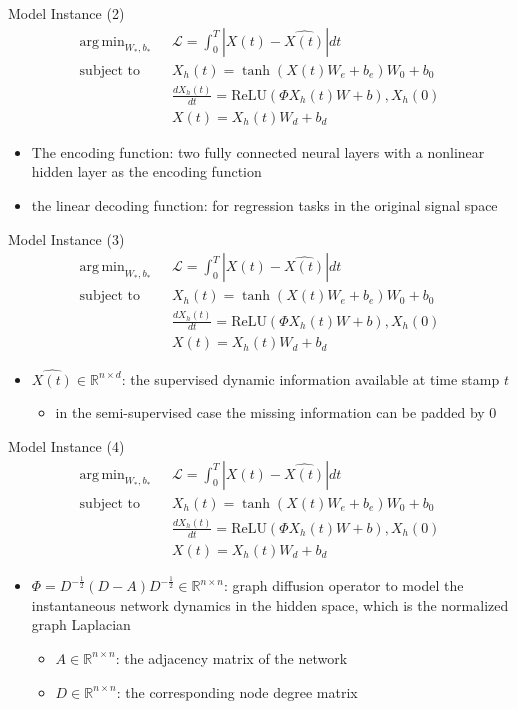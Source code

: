 \documentclass{beamer}
\DeclareMathOperator*{\argmin}{arg\,min}
\begin{document}
\begin{frame}{Model Instance (2)}\[
\begin{split}
\argmin_{W_*,b_*}\text{ }&\mathcal{L}=\int_0^T|X(t)-\hat{X(t)}|dt\\
\text{subject to }&X_h(t)=\tanh(X(t)W_e+b_e)W_0+b_0\\
&\frac{dX_h(t)}{dt}=\text{ReLU}(\Phi X_h(t)W+b),X_h(0)\\
&X(t)=X_h(t)W_d+b_d
\end{split}
\]
\begin{itemize}
\item The encoding function: two fully connected neural layers with a nonlinear hidden layer as the encoding function
\item the linear decoding function: for regression tasks in the original signal space
\end{itemize}
\end{frame}

\begin{frame}{Model Instance (3)}\[
\begin{split}
\argmin_{W_*,b_*}\text{ }&\mathcal{L}=\int_0^T|X(t)-\hat{X(t)}|dt\\
\text{subject to }&X_h(t)=\tanh(X(t)W_e+b_e)W_0+b_0\\
&\frac{dX_h(t)}{dt}=\text{ReLU}(\Phi X_h(t)W+b),X_h(0)\\
&X(t)=X_h(t)W_d+b_d
\end{split}
\]
\begin{itemize}
\item $\hat{X(t)}\in\mathbb{R}^{n\times d}$: the supervised dynamic information available at time stamp $t$
\begin{itemize}
\item in the semi-supervised case the missing information can be padded by $0$
\end{itemize}
\end{itemize}
\end{frame}

\begin{frame}{Model Instance (4)}\[
\begin{split}
\argmin_{W_*,b_*}\text{ }&\mathcal{L}=\int_0^T|X(t)-\hat{X(t)}|dt\\
\text{subject to }&X_h(t)=\tanh(X(t)W_e+b_e)W_0+b_0\\
&\frac{dX_h(t)}{dt}=\text{ReLU}(\Phi X_h(t)W+b),X_h(0)\\
&X(t)=X_h(t)W_d+b_d
\end{split}
\]
\begin{itemize}
\item $\Phi=D^{-\frac{1}{2}}(D-A)D^{-\frac{1}{2}}\in\mathbb{R}^{n\times n}$: graph diffusion operator to model the instantaneous network dynamics in the hidden space, which is the normalized graph Laplacian
\begin{itemize}
\item $A\in\mathbb{R}^{n\times n}$: the adjacency matrix of the network
\item $D\in\mathbb{R}^{n\times n}$: the corresponding node degree matrix
\end{itemize}
\end{itemize}
\end{frame}
\end{document}
